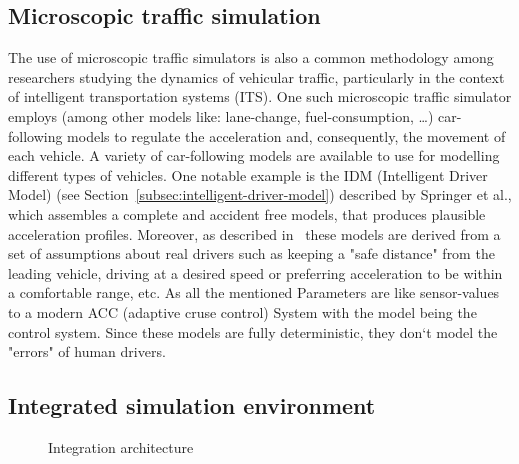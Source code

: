     \subsection{Microscopic traffic simulation}\label{subsec:microscopic-traffic-simulation}
        The use of microscopic traffic simulators is also a common methodology among researchers studying the dynamics of vehicular traffic, particularly in the context of intelligent transportation systems (ITS)\cite{toledo2005microscopic}.
        One such microscopic traffic simulator employs (among other models like: lane-change, fuel-consumption, \ldots) car-following models to regulate the acceleration and, consequently, the movement of each vehicle\cite{treiber2013traffic}.
        A variety of car-following models are available to use for modelling different types of vehicles.
        One notable example is the IDM (Intelligent Driver Model) (see Section~\ref{subsec:intelligent-driver-model}) described by Springer et al., which assembles a complete and accident free models, that produces plausible acceleration profiles\cite{treiber2013traffic}.
        Moreover, as described in~\cite{treiber2013traffic} these models are derived from a set of assumptions about real drivers such as keeping a "safe distance" from the leading vehicle, driving at a desired speed or preferring acceleration to be within a comfortable range, etc.
        As all the mentioned Parameters are like sensor-values to a modern ACC (adaptive cruse control) System with the model being the control system.
        Since these models are fully deterministic, they don`t model the "errors" of human drivers.

    \subsection{Integrated simulation environment}\label{subsec:integrated-simulation-environment}

        \begin{figure}
            \centering
            \caption{Integration architecture}
            \label{fig:int:architecture}
        \end{figure}

